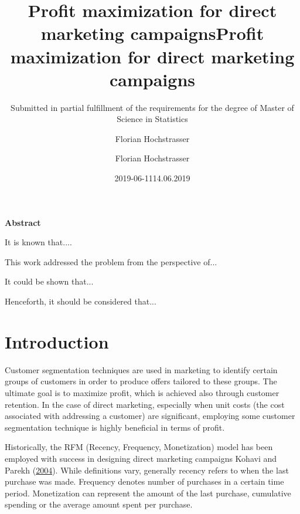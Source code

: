 \documentclass[
  11pt,
  a4paper,
  DIV=12,captions=tableheading,oneside,titlepage]{scrbook}
\title{Profit maximization for direct marketing campaigns}
\author{Florian Hochstrasser}
\date{2019-06-11}
\makeatletter
\newcommand\abstractname{Abstract}  %
\newenvironment{abstract}{%
      \titlepage
      \null\vfil
      \@beginparpenalty\@lowpenalty
      \begin{center}%
        \bfseries \abstractname
        \@endparpenalty\@M
      \end{center}}%
     {\par\vfil\null\endtitlepage}
\newenvironment{abstract}{%
      \if@twocolumn
        \addchap*{\abstractname}%
      \else
        \small
        \begin{center}%
          \addchap*{\abstractname}%
        \end{center}%
        \quotation
      \fi}
      {\if@twocolumn\else\endquotation\fi}
\let\oldmaketitle\maketitle
\makeatother
\begin{document}
\maketitle

\begin{titlepage}

\titlehead{Master Thesis}
\title{Profit maximization for direct marketing campaigns}
\subject{An application of data-driven decision making}
\subtitle{Submitted in partial fulfillment of the requirements for the degree of Master of Science in Statistics}
\author{Florian Hochstrasser}
\date{14.06.2019}
\publishers{Supervisor: Jacques Zuber}

\end{titlepage}

\let\maketitle\oldmaketitle
\maketitle

\begin{abstract}

It is known that....

This work addressed the problem from the perspective of...

It could be shown that...

Henceforth, it should be considered that...
\end{abstract}

{
\setcounter{tocdepth}{2}
\tableofcontents
}
\listoftables
\listoffigures
\hypertarget{intro}{%
\chapter{Introduction}\label{intro}}

Customer segmentation techniques are used in marketing to identify certain groups of customers in order to produce offers tailored to these groups. The ultimate goal is to maximize profit, which is achieved also through customer retention. In the case of direct marketing, especially when unit costs (the cost associated with addressing a customer) are significant, employing some customer segmentation technique is highly beneficial in terms of profit.

Historically, the RFM (Recency, Frequency, Monetization) model has been employed with success in designing direct marketing campaigns Kohavi and Parekh (\protect\hyperlink{ref-kohavi2004visualizing}{2004}). While definitions vary, generally recency refers to when the last purchase was made. Frequency denotes number of purchases in a certain time period. Monetization can represent the amount of the last purchase, cumulative spending or the average amount spent per purchase.
\end{document}
